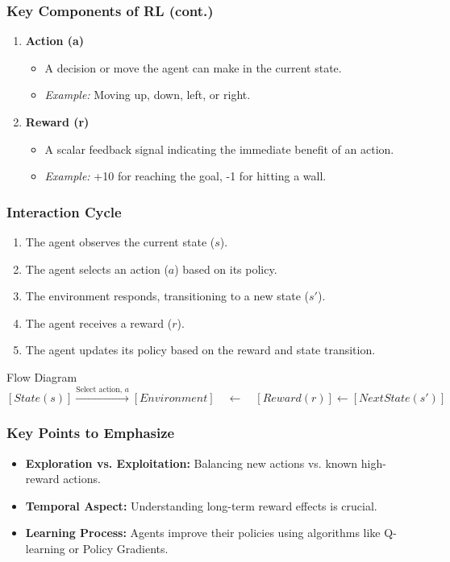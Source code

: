 \documentclass[aspectratio=169]{beamer}
\begin{document}
\begin{frame}[fragile]
    \frametitle{Key Components of RL (cont.)}
    \begin{enumerate}[resume]
        \item \textbf{Action (a)}
            \begin{itemize}
                \item A decision or move the agent can make in the current state.
                \item \textit{Example:} Moving up, down, left, or right.
            \end{itemize}
        \item \textbf{Reward (r)}
            \begin{itemize}
                \item A scalar feedback signal indicating the immediate benefit of an action.
                \item \textit{Example:} +10 for reaching the goal, -1 for hitting a wall.
            \end{itemize}
    \end{enumerate}
\end{frame}

\begin{frame}[fragile]
    \frametitle{Interaction Cycle}
    \begin{enumerate}
        \item The agent observes the current state (\(s\)).
        \item The agent selects an action (\(a\)) based on its policy.
        \item The environment responds, transitioning to a new state (\(s'\)).
        \item The agent receives a reward (\(r\)).
        \item The agent updates its policy based on the reward and state transition.
    \end{enumerate}
    \begin{block}{Flow Diagram}
        \[
        [State (s)] \xrightarrow{\text{Select action, } a} [Environment] 
        \quad \leftarrow \quad [Reward (r)] \xleftarrow{} [Next State (s')]
        \]
    \end{block}
\end{frame}

\begin{frame}[fragile]
    \frametitle{Key Points to Emphasize}
    \begin{itemize}
        \item \textbf{Exploration vs. Exploitation:} Balancing new actions vs. known high-reward actions.
        \item \textbf{Temporal Aspect:} Understanding long-term reward effects is crucial.
        \item \textbf{Learning Process:} Agents improve their policies using algorithms like Q-learning or Policy Gradients.
    \end{itemize}
\end{frame}
\end{document}
